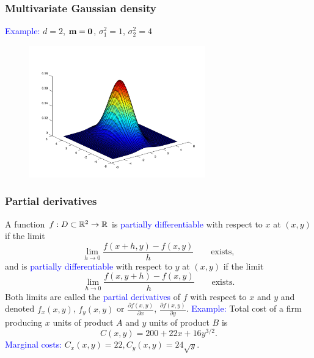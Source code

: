 \documentclass[11pt,aspectratio=169]{beamer}
\begin{document}
\begin{frame}
\frametitle{Multivariate Gaussian density}
\begin{small}
\textcolor{blue}{Example:} $d=2$, ${\bf m}={\bf 0}$, $\sigma_1^2=1$, $\sigma_2^2=4$
\end{small}
\begin{figure}
\includegraphics[width=3in]{img/multiv} 
\end{figure}
\end{frame}

\begin{frame}
\frametitle{Partial derivatives}
\begin{small}
A function $f: D \subset\mathbb R^2 \rightarrow \mathbb R$ is \textcolor{blue}{partially differentiable} with respect to $x$ at $(x,y)$ if the limit
$$
\lim_{h\rightarrow 0} \frac{f(x+h,y)-f(x,y)}{h} \qquad \text{exists},
$$
and is \textcolor{blue}{partially differentiable} with respect to $y$ at $(x,y)$ if the limit
$$
\lim_{h\rightarrow 0} \frac{f(x,y+h)-f(x,y)}{h} \qquad \text{exists}.
$$
Both limits are called the \textcolor{blue}{partial derivatives} of $f$ with respect to $x$ and $y$ and denoted $f_x(x,y)$, $f_y(x,y)$ or 
$\frac{\partial f(x,y)}{\partial x} $, $\frac{\partial f(x,y)}{\partial y}$.
\vskip 10pt
\textcolor{blue}{Example:} Total cost of a firm producing $x$ units of product $A$ and $y$ units of product $B$ is
$$
C(x,y)=200+22x+16y^{3/2}.
$$ 
\textcolor{blue}{Marginal costs:} $C_x(x,y)=22, C_y(x,y)=24 \sqrt{y}$.


\end{small}
\end{frame}
\end{document}
